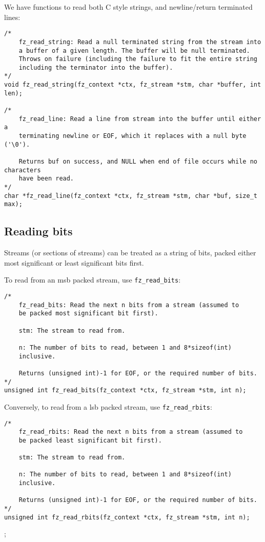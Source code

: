\documentclass[oneside]{book}
\begin{document}
We have functions to read both C style strings, and newline/return terminated lines:

\begin{lstlisting}
/*
	fz_read_string: Read a null terminated string from the stream into
	a buffer of a given length. The buffer will be null terminated.
	Throws on failure (including the failure to fit the entire string
	including the terminator into the buffer).
*/
void fz_read_string(fz_context *ctx, fz_stream *stm, char *buffer, int len);

/*
	fz_read_line: Read a line from stream into the buffer until either a
	terminating newline or EOF, which it replaces with a null byte ('\0').

	Returns buf on success, and NULL when end of file occurs while no characters
	have been read.
*/
char *fz_read_line(fz_context *ctx, fz_stream *stm, char *buf, size_t max);
\end{lstlisting}

\subsection{Reading bits}

Streams (or sections of streams) can be treated as a string of bits, packed either most significant or least significant bits first.

To read from an msb packed stream, use \texttt{fz\_read\_bits}:

\begin{lstlisting}
/*
	fz_read_bits: Read the next n bits from a stream (assumed to
	be packed most significant bit first).

	stm: The stream to read from.

	n: The number of bits to read, between 1 and 8*sizeof(int)
	inclusive.

	Returns (unsigned int)-1 for EOF, or the required number of bits.
*/
unsigned int fz_read_bits(fz_context *ctx, fz_stream *stm, int n);
\end{lstlisting}

Conversely, to read from a lsb packed stream, use \texttt{fz\_read\_rbits}:

\begin{lstlisting}
/*
	fz_read_rbits: Read the next n bits from a stream (assumed to
	be packed least significant bit first).

	stm: The stream to read from.

	n: The number of bits to read, between 1 and 8*sizeof(int)
	inclusive.

	Returns (unsigned int)-1 for EOF, or the required number of bits.
*/
unsigned int fz_read_rbits(fz_context *ctx, fz_stream *stm, int n);
\end{lstlisting};
\end{document}

